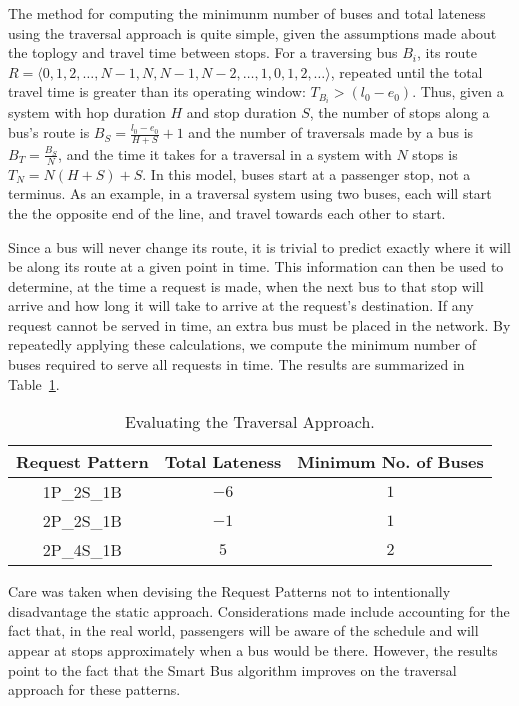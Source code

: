 \documentclass[runningheads]{llncs}
\begin{document}
The method for computing the minimunm number of buses and total lateness using the traversal approach is quite simple, given the assumptions made about the toplogy and travel time between stops. For a traversing bus $B_i$, its route $R = \langle 0, 1, 2, \dots, N-1, N, N-1, N-2, \dots, 1, 0, 1, 2, \dots \rangle$, repeated until the total travel time is greater than its operating window: $T_{B_i} > (l_0 - e_0)$. Thus, given a system with hop duration $H$ and stop duration $S$, the number of stops along a bus's route is $B_S = \frac{l_0 - e_0}{H + S} + 1$ and the number of traversals made by a bus is $B_T = \frac{B_S}{N}$, and the time it takes for a traversal in a system with $N$ stops is $T_N = N (H + S) + S$. In this model, buses start at a passenger stop, not a terminus. As an example, in a traversal system using two buses, each will start the the opposite end of the line, and travel towards each other to start.

Since a bus will never change its route, it is trivial to predict exactly where it will be along its route at a given point in time. This information can then be used to determine, at the time a request is made, when the next bus to that stop will arrive and how long it will take to arrive at the request's destination. If any request cannot be served in time, an extra bus must be placed in the network. By repeatedly applying these calculations, we compute the minimum number of buses required to serve all requests in time. The results are summarized in Table~\ref{tbl:traversal}.

\setlength{\tabcolsep}{1em}
\begin{table}[htbp]
\centering
\caption{Evaluating the Traversal Approach.}
\begin{tabular}{c c c}
Request Pattern & Total Lateness & Minimum No. of Buses \\ \hline
1P\_2S\_1B & $-6$ & $1$ \\
2P\_2S\_1B & $-1$ & $1$ \\
2P\_4S\_1B & $5$  & $2$ \\
\end{tabular}
\label{tbl:traversal}
\end{table}

Care was taken when devising the Request Patterns not to intentionally disadvantage the static approach. Considerations made include accounting for the fact that, in the real world, passengers will be aware of the schedule and will appear at stops approximately when a bus would be there. However, the results point to the fact that the Smart Bus algorithm improves on the traversal approach for these patterns.
\end{document}

